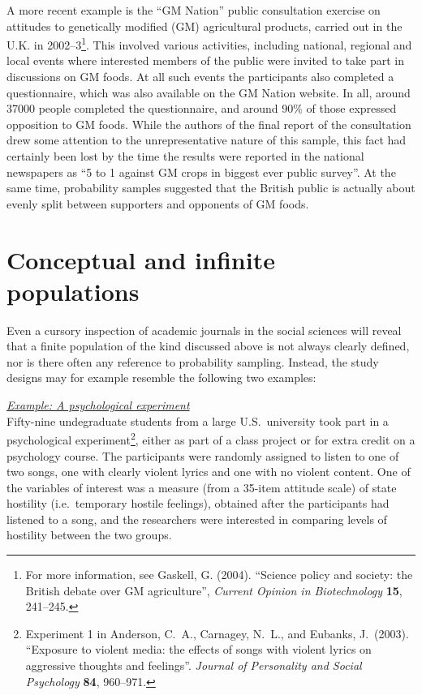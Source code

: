 A more recent example is the ``GM Nation'' public
consultation exercise on attitudes to genetically modified (GM)
agricultural products, carried out in the U.K. in 2002--3\footnote{For
more information, see Gaskell, G. (2004). ``Science policy and society:
the British debate over GM agriculture'', \emph{Current Opinion in
Biotechnology} \textbf{15}, 241--245.}. This involved various
activities, including national, regional and local events where
interested members of the public were invited to take part in
discussions on GM foods. At all such events the participants also
completed a questionnaire, which was also available on the GM Nation
website. In all, around 37000 people completed the questionnaire, and
around 90\% of those expressed opposition to GM foods. While the authors
of the final report of the consultation drew some attention to the
unrepresentative nature of this sample, this fact had certainly been
lost by the time the results were reported in the national newspapers as
``5 to 1 against GM crops in biggest ever public
survey''. At the same time, probability samples suggested that the
British public is actually about evenly split between supporters and
opponents of GM foods.

\section{Conceptual and infinite populations}
\label{s_samples_infpops}

Even a cursory inspection of academic journals in the social sciences
will reveal that a finite population of the kind discussed above is not
always clearly defined, nor is there often any reference to probability
sampling. Instead, the study designs may for example resemble the
following two examples:

\underline{\emph{Example: A psychological experiment}}\\
Fifty-nine undegraduate students from a large U.S.\ university took part
in a psychological experiment\footnote{Experiment 1 in Anderson, C.\ A.,
Carnagey, N.\ L., and Eubanks, J.\ (2003). ``Exposure to violent media:
the effects of songs with violent lyrics on aggressive thoughts and
feelings''. \emph{Journal of Personality and Social Psychology}
\textbf{84}, 960--971.}, either as part of a class project or for extra
credit on a psychology course. The participants were randomly assigned
to listen to one of two songs, one with clearly violent lyrics and one
with no violent content. One of the variables of interest was a measure
(from a 35-item attitude scale) of state hostility (i.e.\ temporary
hostile feelings), obtained after the participants had listened to a
song, and the researchers were interested in comparing levels of
hostility between the two groups.

